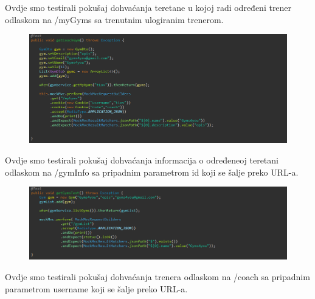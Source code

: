 			\noindent {}
			
			Ovdje smo testirali pokušaj dohvaćanja teretane u kojoj radi određeni trener odlaskom na /myGyms sa trenutnim ulogiranim trenerom.

			\begin{figure}[H]
    			\hspace*{-1.5cm}
    			\includegraphics[scale=0.5]{slike/getCoachGym.PNG} %
    			\centering
    			\label{fig:promjene}
    	    \end{figure}
	
				
			\noindent {}
			
			Ovdje smo testirali pokušaj dohvaćanja informacija o određeneoj teretani odlaskom na /gymInfo sa pripadnim parametrom id koji se šalje preko URL-a.
             
			\begin{figure}[H]
    			\hspace*{-1.5cm}
    			\includegraphics[scale=0.5]{slike/getGyms.PNG} %
    			\centering
    			\label{fig:promjene}
    	    \end{figure}
	

			\noindent {}
			
			Ovdje smo testirali pokušaj dohvaćanja trenera odlaskom na /coach sa pripadnim parametrom username koji se šalje preko URL-a.

